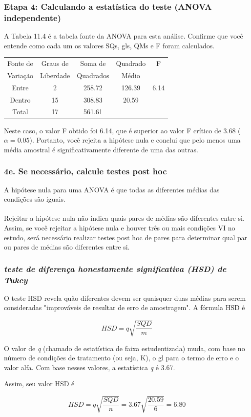 \documentclass[11pt]{beamer}
\begin{document}
\begin{frame}
\frametitle{Etapa 4: Calculando a estatística do teste (ANOVA independente)}
A Tabela 11.4 é a tabela fonte da ANOVA para esta análise. Confirme que você entende como cada um os valores SQs, gls, QMs e F foram calculados.

\begin{table}[h]
\centering
\begin{tabular}{ccccc}
\hline
Fonte de & Graus de & Soma de & Quadrado & F  \\
Variação & Liberdade & Quadrados & Médio &   \\
\hline
Entre & 2 & 258.72 & 126.39 & 6.14   \\
Dentro & 15 & 308.83 & 20.59 &   \\
\hline
Total & 17 & 561.61 &  &   \\
\hline
\end{tabular}
\end{table}

Neste caso, o valor F obtido foi 6.14, que é superior ao valor F crítico de 3.68 (\(\alpha = 0.05\)). Portanto, você rejeita a hipótese nula e conclui que pelo menos uma média amostral é significativamente diferente de uma das outras.


\end{frame}

\begin{frame}
\frametitle{4e. Se necessário, calcule testes post hoc}
A hipótese nula para uma ANOVA é que todas as diferentes médias das condições são iguais. \\~\\

Rejeitar a hipótese nula não indica quais pares de médias são diferentes entre si. Assim, se você rejeitar a hipótese nula e houver três ou mais condições VI no estudo, será necessário realizar testes post hoc de pares para determinar qual par ou pares de médias são diferentes entre si. 

\end{frame}

\begin{frame}
\frametitle{\textit{teste de diferença honestamente significativa (HSD) de Tukey}}

O teste HSD revela quão diferentes devem ser quaisquer duas médias para serem consideradas "improváveis de resultar de erro de amostragem". A fórmula HSD é

\[HSD = q\sqrt{\frac{SQD}{m}}\]

O valor de \textit{q} (chamado de estatística de faixa estudentizada) muda, com base no número de condições de tratamento (ou seja, K), o gl para o termo de erro e o valor alfa. Com base nesses valores, a estatística \textit{q} é 3.67.

Assim, seu valor HSD é

\[HSD = q\sqrt{\frac{SQD}{n}}= 3.67\sqrt{\frac{20.59}{6}}=6.80\]

\end{frame}
\end{document}
